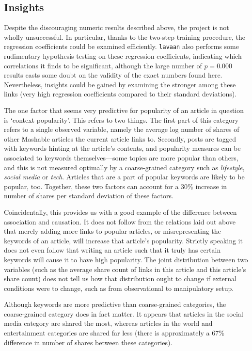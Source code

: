 \documentclass{article}
\begin{document}
\subsection{Insights}
Despite the discouraging numeric results described above, the project is not wholly unsuccessful. In particular, thanks to the two-step training procedure, the regression coefficients could be examined efficiently. \texttt{lavaan} also performs some rudimentary hypothesis testing on these regression coefficients, indicating which correlations it finds to be significant, although the large number of $p=0.000$ results casts some doubt on the validity of the exact numbers found here. Nevertheless, insights could be gained by examining the stronger among these links (very high regression coefficients compared to their standard deviations).

The one factor that seems very predictive for popularity of an article in question is `context popularity'. This refers to two things. The first part of this category refers to a single observed variable, namely the average log number of shares of other Mashable articles the current article links to. Secondly, posts are tagged with keywords hinting at the article's contents, and popularity measures can be associated to keywords themselves---some topics are more popular than others, and this is not measured optimally by a coarse-grained category such as \emph{lifestyle}, \emph{social media} or \emph{tech}. Articles that are a part of popular keywords are likely to be popular, too. Together, these two factors can account for a $30\%$ increase in number of shares per standard deviation of these factors.

Coincidentally, this provides us with a good example of the difference between association and causation. It does not follow from the relations laid out above that merely adding more links to popular articles, or misrepresenting the keywords of an article, will increase that article's popularity. Strictly speaking it does not even follow that writing an article such that it truly has certain keywords will cause it to have high popularity. The joint distribution between two variables (such as the average share count of links in this article and this article's share count) does not tell us how that distribution ought to change if external conditions were to change, such as from observational to manipulatory setup.

Although keywords are more predictive than coarse-grained categories, the coarse-grained category does in fact matter. It appears that articles in the social media category are shared the most, whereas articles in the world and entertainment categories are shared far less (there is approximately a $67\%$ difference in number of shares between these categories).
\end{document}
